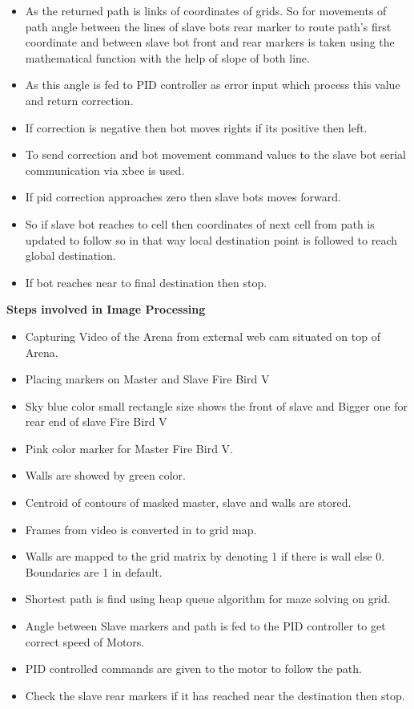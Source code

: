 \documentclass[report]{res}
\begin{document}
\begin{itemize}
		\item As the returned path is links of coordinates of grids. So for movements of path angle between the lines of slave bots rear marker to route path’s first coordinate and between slave bot front and rear markers is taken using the mathematical function with the help of slope of both line. 
		\item As this angle is fed to PID controller as error input which process this value and return correction. 
		\item If correction is negative then bot moves rights if its positive then left. 
		\item To send correction and bot movement command values to the slave bot serial communication via xbee is used. 
		\item If pid correction approaches zero then slave bots moves forward. 
		\item So if slave bot reaches to cell then coordinates of next cell from path is updated to follow so in that way local destination point is followed to reach global destination. 
		\item If bot reaches near to final destination then stop.
	\end{itemize}
	
	\pagebreak
	
	
	\textbf{Steps involved in Image Processing}
	
	\begin{itemize}
		\item	Capturing Video of the Arena from external web cam situated on top of Arena.
		\item	Placing markers on Master and Slave Fire Bird V
		\item	Sky blue color small rectangle size shows the front of slave and Bigger one for rear end of slave Fire Bird V
		\item	Pink color marker for Master Fire Bird V.
		\item	Walls are showed by green color.
		\item	Centroid of contours of masked master, slave and walls are stored.
		\item	Frames from video is converted in to grid map.
		\item	Walls are mapped to the grid matrix by denoting 1 if there is wall else 0. Boundaries are 1 in default.
		\item	Shortest path is find using heap queue algorithm for maze solving on grid.
		\item	Angle between Slave markers and path is fed to the PID controller to get correct speed of Motors.
		\item	PID controlled commands are given to the motor to follow the path.
		\item	Check the slave rear markers if it has reached near the destination then stop.
	\end{itemize}
	
\end{document}
